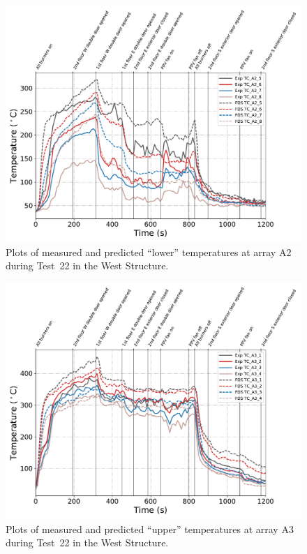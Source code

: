 \begin{figure}[!h]
	\centering
	\includegraphics[width=\columnwidth]{Figures/Plots/Validation/Temperature/Test_22_TC_A2_lower}
	\caption{Plots of measured and predicted ``lower'' temperatures at array A2 during Test~22 in the West Structure.}
	\label{fig:TCA2_lower_data_Test22}
\end{figure}

\begin{figure}[!h]
	\centering
	\includegraphics[width=\columnwidth]{Figures/Plots/Validation/Temperature/Test_22_TC_A3_upper}
	\caption{Plots of measured and predicted ``upper'' temperatures at array A3 during Test~22 in the West Structure.}
	\label{fig:TCA3_upper_data_Test22}
\end{figure}

